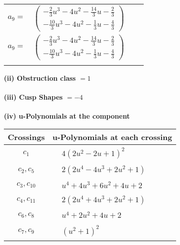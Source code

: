 \documentclass[1p]{elsarticle_modified}
\theoremstyle{definition}
\begin{document}
\begin{tabular}{m{7pt} m{180pt} m{7pt} m{180pt} }
\flushright $a_{9}=$&$\begin{pmatrix}-\frac{2}{3} u^3-4 u^2-\frac{14}{3} u-\frac{2}{3}\\-\frac{10}{3} u^3-4 u^2-\frac{1}{3} u-\frac{4}{3}\end{pmatrix}$\\ \flushright $a_{9}=$&$\begin{pmatrix}-\frac{2}{3} u^3-4 u^2-\frac{14}{3} u-\frac{2}{3}\\-\frac{10}{3} u^3-4 u^2-\frac{1}{3} u-\frac{4}{3}\end{pmatrix}$\\&\end{tabular}
\flushleft \textbf{(ii) Obstruction class $= 1$}\\~\\
\flushleft \textbf{(iii) Cusp Shapes $= -4$}\\~\\
\newpage\renewcommand{\arraystretch}{1}
\flushleft \textbf{(iv) u-Polynomials at the component}\newline \\
\begin{tabular}{m{50pt}|m{274pt}}
Crossings & \hspace{64pt}u-Polynomials at each crossing \\
\hline $$\begin{aligned}c_{1}\end{aligned}$$&$\begin{aligned}
&4(2 u^2-2 u+1)^2
\end{aligned}$\\
\hline $$\begin{aligned}c_{2},c_{5}\end{aligned}$$&$\begin{aligned}
&2(2 u^4-4 u^3+2 u^2+1)
\end{aligned}$\\
\hline $$\begin{aligned}c_{3},c_{10}\end{aligned}$$&$\begin{aligned}
&u^4+4 u^3+6 u^2+4 u+2
\end{aligned}$\\
\hline $$\begin{aligned}c_{4},c_{11}\end{aligned}$$&$\begin{aligned}
&2(2 u^4+4 u^3+2 u^2+1)
\end{aligned}$\\
\hline $$\begin{aligned}c_{6},c_{8}\end{aligned}$$&$\begin{aligned}
&u^4+2 u^2+4 u+2
\end{aligned}$\\
\hline $$\begin{aligned}c_{7},c_{9}\end{aligned}$$&$\begin{aligned}
&(u^2+1)^2
\end{aligned}$\\
\hline
\end{tabular}\\~\\
\end{document}
